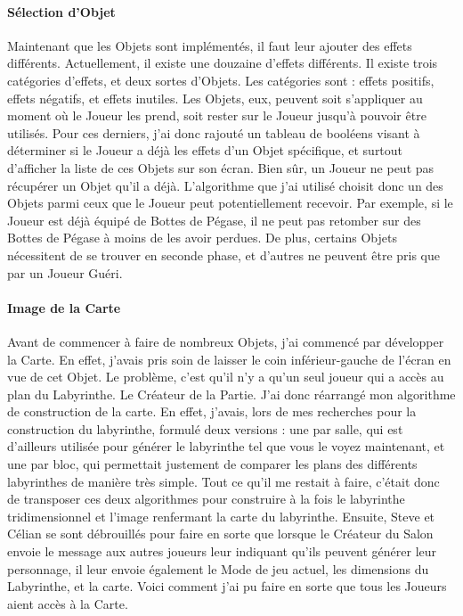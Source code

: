 \documentclass{article}
\begin{document}
\paragraph{Sélection d'Objet}
Maintenant que les Objets sont implémentés, il faut leur ajouter des effets différents. Actuellement, il existe une douzaine d'effets différents. Il existe trois catégories d'effets, et deux sortes d'Objets. Les catégories sont : effets positifs, effets négatifs, et effets inutiles. Les Objets, eux, peuvent soit s'appliquer au moment où le Joueur les prend, soit rester sur le Joueur jusqu'à pouvoir être utilisés. Pour ces derniers, j'ai donc rajouté un tableau de booléens visant à déterminer si le Joueur a déjà les effets d'un Objet spécifique, et surtout d'afficher la liste de ces Objets sur son écran. Bien sûr, un Joueur ne peut pas récupérer un Objet qu'il a déjà. L'algorithme que j'ai utilisé choisit donc un des Objets parmi ceux que le Joueur peut potentiellement recevoir. Par exemple, si le Joueur est déjà équipé de Bottes de Pégase, il ne peut pas retomber sur des Bottes de Pégase à moins de les avoir perdues. De plus, certains Objets nécessitent de se trouver en seconde phase, et d'autres ne peuvent être pris que par un Joueur Guéri.

\paragraph{Image de la Carte}
Avant de commencer à faire de nombreux Objets, j'ai commencé par développer la Carte. En effet, j'avais pris soin de laisser le coin inférieur-gauche de l'écran en vue de cet Objet. Le problème, c'est qu'il n'y a qu'un seul joueur qui a accès au plan du Labyrinthe. Le Créateur de la Partie. J'ai donc réarrangé mon algorithme de construction de la carte. En effet, j'avais, lors de mes recherches pour la construction du labyrinthe, formulé deux versions : une par salle, qui est d'ailleurs utilisée pour générer le labyrinthe tel que vous le voyez maintenant, et une par bloc, qui permettait justement de comparer les plans des différents labyrinthes de manière très simple. Tout ce qu'il me restait à faire, c'était donc de transposer ces deux algorithmes pour construire à la fois le labyrinthe tridimensionnel et l'image renfermant la carte du labyrinthe. Ensuite, Steve et Célian se sont débrouillés pour faire en sorte que lorsque le Créateur du Salon envoie le message aux autres joueurs leur indiquant qu'ils peuvent générer leur personnage, il leur envoie également le Mode de jeu actuel, les dimensions du Labyrinthe, et la carte. Voici comment j'ai pu faire en sorte que tous les Joueurs aient accès à la Carte.
\end{document}
